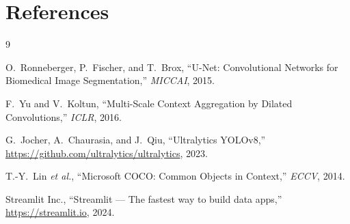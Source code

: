 \documentclass[12pt, a4paper]{article}
\begin{document}
\section*{References}

\begin{thebibliography}{9}

O.\ Ronneberger, P.\ Fischer, and T.\ Brox,
``U-Net: Convolutional Networks for Biomedical Image Segmentation,''
\textit{MICCAI}, 2015.

F.\ Yu and V.\ Koltun,
``Multi-Scale Context Aggregation by Dilated Convolutions,''
\textit{ICLR}, 2016.

G.\ Jocher, A.\ Chaurasia, and J.\ Qiu,
``Ultralytics YOLOv8,''
\url{https://github.com/ultralytics/ultralytics}, 2023.

T.-Y.\ Lin \textit{et al.},
``Microsoft COCO: Common Objects in Context,''
\textit{ECCV}, 2014.

Streamlit Inc., ``Streamlit --- The fastest way to build data apps,''
\url{https://streamlit.io}, 2024.

\end{thebibliography}
\end{document}
